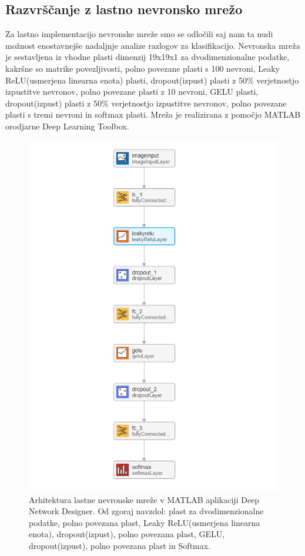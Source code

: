\subsection{Razvrščanje z lastno nevronsko mrežo}
Za lastno implementacijo nevronske mreže smo se odločili saj nam ta nudi možnost enostavnejše nadaljnje analize razlogov za klasifikacijo.
Nevronska mreža je sestavljena iz vhodne plasti dimenzij 19x19x1 za dvodimenzionalne podatke, kakršne so matrike povezljivosti, polno povezane plasti s 100 nevroni, Leaky ReLU(usmerjena linearna enota) plasti, dropout(izpust) plasti z 50\% verjetnostjo izpustitve nevronov, polno povezane plasti z 10 nevroni, GELU plasti, dropout(izpust) plasti z 50\% verjetnostjo izpustitve nevronov, polno povezane plasti s tremi nevroni in softmax plasti. Mreža je realizirana z pomočjo MATLAB orodjarne Deep Learning Toolbox. 
\begin{figure}[h!]
\begin{center}
\includegraphics[width=0.8\linewidth]{slike/Neural network.png}
\end{center}
\caption[Arhitektura lastne nevronske mreže.]{Arhitektura lastne nevronske mreže v MATLAB aplikaciji Deep Network Designer. Od zgoraj navzdol: plast za dvodimenzionalne podatke, polno povezana plast, Leaky ReLU(usmerjena linearna enota), dropout(izpust), polno povezana plast, GELU, dropout(izpust), polno povezana plast in Softmax.}
\end{figure}






